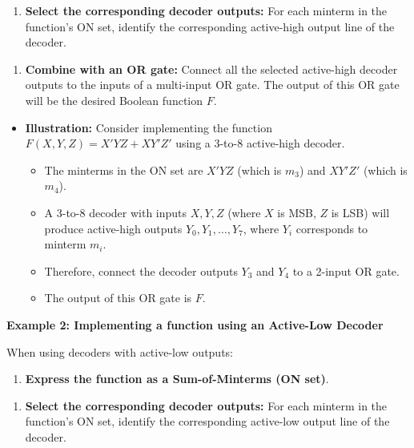 \documentclass{article}
\begin{document}
\begin{itemize}
\begin{enumerate}
\end{enumerate}
\begin{enumerate}
\item \textbf{Select the corresponding decoder outputs:} For each minterm in the function's ON set, identify the corresponding active-high output line of the decoder.

\end{enumerate}
\begin{enumerate}
\item \textbf{Combine with an OR gate:} Connect all the selected active-high decoder outputs to the inputs of a multi-input OR gate. The output of this OR gate will be the desired Boolean function $F$.

\end{enumerate}
\begin{itemize}
    \item \textbf{Illustration:} Consider implementing the function $F(X,Y,Z) = X'YZ + XY'Z'$ using a 3-to-8 active-high decoder.

        \begin{itemize}
            \item The minterms in the ON set are $X'YZ$ (which is $m_3$) and $XY'Z'$ (which is $m_4$).
            \item A 3-to-8 decoder with inputs $X,Y,Z$ (where $X$ is MSB, $Z$ is LSB) will produce active-high outputs $Y_0, Y_1, \dots, Y_7$, where $Y_i$ corresponds to minterm $m_i$.
            \item Therefore, connect the decoder outputs $Y_3$ and $Y_4$ to a 2-input OR gate.
            \item The output of this OR gate is $F$.
        \end{itemize}
\end{itemize}

\textbf{Example 2: Implementing a function using an Active-Low Decoder}

When using decoders with active-low outputs:

\begin{enumerate}
\item \textbf{Express the function as a Sum-of-Minterms (ON set)}.

\end{enumerate}
\begin{enumerate}
\item \textbf{Select the corresponding decoder outputs:} For each minterm in the function's ON set, identify the corresponding active-low output line of the decoder.


\end{enumerate}
\end{itemize}
\end{document}
